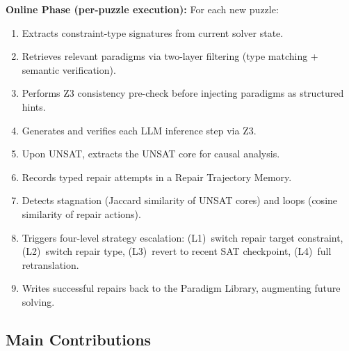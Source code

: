 \textbf{Online Phase (per-puzzle execution):} For each new puzzle:
\begin{enumerate}
    \item Extracts constraint-type signatures from current solver state.
    \item Retrieves relevant paradigms via two-layer filtering (type matching + semantic verification).
    \item Performs Z3 consistency pre-check before injecting paradigms as structured hints.
    \item Generates and verifies each LLM inference step via Z3.
    \item Upon UNSAT, extracts the UNSAT core for causal analysis.
    \item Records typed repair attempts in a Repair Trajectory Memory.
    \item Detects stagnation (Jaccard similarity of UNSAT cores) and loops (cosine similarity of repair actions).
    \item Triggers four-level strategy escalation: (L1)~switch repair target constraint, (L2)~switch repair type, (L3)~revert to recent SAT checkpoint, (L4)~full retranslation.
    \item Writes successful repairs back to the Paradigm Library, augmenting future solving.
\end{enumerate}

\subsection{Main Contributions}


